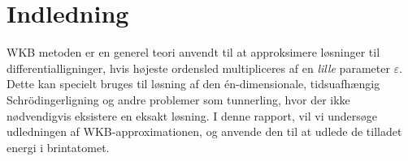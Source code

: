 \section{Indledning}
WKB metoden er en generel teori anvendt til at approksimere løsninger til differentialligninger, hvis højeste ordensled multipliceres af en \emph{lille} parameter $\varepsilon$. Dette kan specielt bruges til løsning af den én-dimensionale, tidsuafhængig Schrödingerligning og andre problemer som tunnerling, hvor der ikke nødvendigvis eksistere en eksakt løsning. I denne rapport, vil vi undersøge udledningen af WKB-approximationen, og anvende den til at udlede de tilladet energi i brintatomet. 
